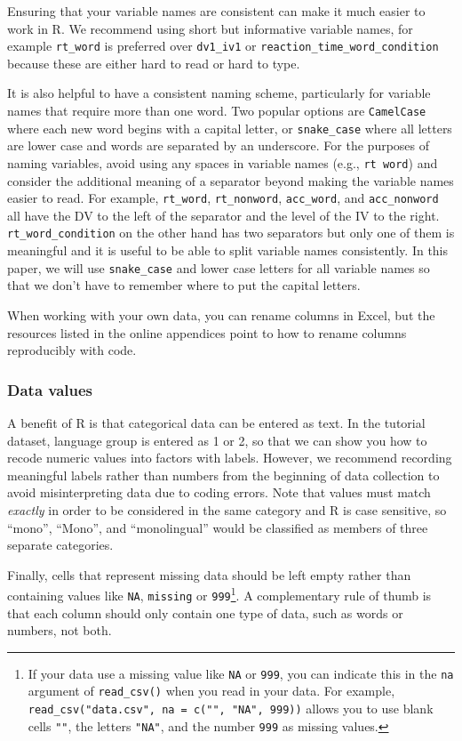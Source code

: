 \documentclass[
  english,
  doc,floatsintext]{apa6}
\begin{document}
Ensuring that your variable names are consistent can make it much easier to work in R. We recommend using short but informative variable names, for example \texttt{rt\_word} is preferred over \texttt{dv1\_iv1} or \texttt{reaction\_time\_word\_condition} because these are either hard to read or hard to type.

It is also helpful to have a consistent naming scheme, particularly for variable names that require more than one word. Two popular options are \texttt{CamelCase} where each new word begins with a capital letter, or \texttt{snake\_case} where all letters are lower case and words are separated by an underscore. For the purposes of naming variables, avoid using any spaces in variable names (e.g., \texttt{rt\ word}) and consider the additional meaning of a separator beyond making the variable names easier to read. For example, \texttt{rt\_word}, \texttt{rt\_nonword}, \texttt{acc\_word}, and \texttt{acc\_nonword} all have the DV to the left of the separator and the level of the IV to the right. \texttt{rt\_word\_condition} on the other hand has two separators but only one of them is meaningful and it is useful to be able to split variable names consistently. In this paper, we will use \texttt{snake\_case} and lower case letters for all variable names so that we don't have to remember where to put the capital letters.

When working with your own data, you can rename columns in Excel, but the resources listed in the online appendices point to how to rename columns reproducibly with code.

\hypertarget{data-values}{%
\subsubsection{Data values}\label{data-values}}

A benefit of R is that categorical data can be entered as text. In the tutorial dataset, language group is entered as 1 or 2, so that we can show you how to recode numeric values into factors with labels. However, we recommend recording meaningful labels rather than numbers from the beginning of data collection to avoid misinterpreting data due to coding errors. Note that values must match \emph{exactly} in order to be considered in the same category and R is case sensitive, so ``mono'', ``Mono'', and ``monolingual'' would be classified as members of three separate categories.

Finally, cells that represent missing data should be left empty rather than containing values like \texttt{NA}, \texttt{missing} or \texttt{999}\footnote{If your data use a missing value like \texttt{NA} or \texttt{999}, you can indicate this in the \texttt{na} argument of \texttt{read\_csv()} when you read in your data. For example, \texttt{read\_csv("data.csv",\ na\ =\ c("",\ "NA",\ 999))} allows you to use blank cells \texttt{""}, the letters \texttt{"NA"}, and the number \texttt{999} as missing values.}. A complementary rule of thumb is that each column should only contain one type of data, such as words or numbers, not both.
\end{document}
